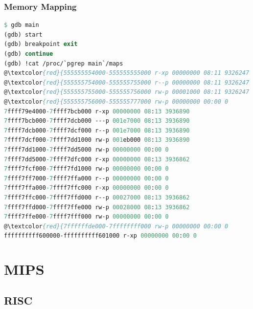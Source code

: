 \documentclass{beamer}
\begin{document}
\begin{frame}[fragile]
\frametitle{Memory Mapping}
\tiny
\begin{lstlisting}[language = pascal, numbers=none]
$ gdb main
(gdb) start
(gdb) breakpoint exit
(gdb) continue
(gdb) !cat /proc/`pgrep main`/maps
@\textcolor{red}{555555554000-555555555000 r-xp 00000000 08:11 9326247                    main}@
@\textcolor{red}{555555754000-555555755000 r--p 00000000 08:11 9326247                    main}@
@\textcolor{red}{555555755000-555555756000 rw-p 00001000 08:11 9326247                    main}@
@\textcolor{red}{555555756000-555555777000 rw-p 00000000 00:00 0                          [heap]}@
7ffff79e4000-7ffff7bcb000 r-xp 00000000 08:13 3936890                    libc-2.27.so
7ffff7bcb000-7ffff7dcb000 ---p 001e7000 08:13 3936890                    libc-2.27.so
7ffff7dcb000-7ffff7dcf000 r--p 001e7000 08:13 3936890                    libc-2.27.so
7ffff7dcf000-7ffff7dd1000 rw-p 001eb000 08:13 3936890                    libc-2.27.so
7ffff7dd1000-7ffff7dd5000 rw-p 00000000 00:00 0
7ffff7dd5000-7ffff7dfc000 r-xp 00000000 08:13 3936862                    ld-2.27.so
7ffff7fcf000-7ffff7fd1000 rw-p 00000000 00:00 0
7ffff7ff7000-7ffff7ffa000 r--p 00000000 00:00 0                          [vvar]
7ffff7ffa000-7ffff7ffc000 r-xp 00000000 00:00 0                          [vdso]
7ffff7ffc000-7ffff7ffd000 r--p 00027000 08:13 3936862                    ld-2.27.so
7ffff7ffd000-7ffff7ffe000 rw-p 00028000 08:13 3936862                    ld-2.27.so
7ffff7ffe000-7ffff7fff000 rw-p 00000000 00:00 0
@\textcolor{red}{7ffffffde000-7ffffffff000 rw-p 00000000 00:00 0                          [stack]}@
ffffffffff600000-ffffffffff601000 r-xp 00000000 00:00 0                  [vsyscall]
\end{lstlisting}

\end{frame}

\section{MIPS}

\subsection{RISC}
\end{document}
